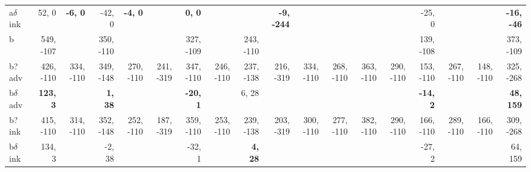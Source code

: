 \begin{table}[p]
{\begin{tabular}{lrrrrrrrrrrrrrrrrr}
a$\delta$ ink & 52, 0 & \textbf{-6, 0} & -42, 0 & \textbf{-4, 0} &  & \textbf{0, 0} &  &  & \textbf{-9, -244} &  &  &  &  & -25, 0 &  &  & \textbf{-16, -46} \\
b & 549, -107 &  & 350, -110 &  &  & 327, -109 &  & 243, -110 &  &  &  &  &  & 139, -108 &  &  & 373, -109 \\
b? adv & 426, -110 & 334, -110 & 349, -148 & 270, -110 & 241, -319 & 347, -110 & 246, -110 & 237, -138 & 216, -319 & 334, -110 & 268, -110 & 363, -110 & 290, -110 & 153, -110 & 267, -110 & 148, -110 & 325, -268 \\
b$\delta$ adv & \textbf{123, 3} &  & \textbf{1, 38} &  &  & \textbf{-20, 1} &  & 6, 28 &  &  &  &  &  & \textbf{-14, 2} &  &  & \textbf{48, 159} \\
b? ink & 415, -110 & 314, -110 & 352, -148 & 252, -110 & 187, -319 & 359, -110 & 253, -110 & 239, -138 & 203, -319 & 300, -110 & 277, -110 & 382, -110 & 290, -110 & 166, -110 & 289, -110 & 166, -110 & 309, -268 \\
b$\delta$ ink & 134, 3 &  & -2, 38 &  &  & -32, 1 &  & \textbf{4, 28} &  &  &  &  &  & -27, 2 &  &  & 64, 159 \\

\end{tabular}
}
\end{table}
\clearpage


